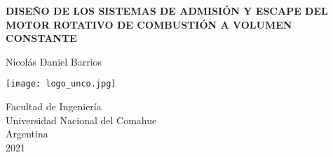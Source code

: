 \begin{titlepage}
    \begin{center}

        \vspace*{2cm}
        \huge
        \MakeUppercase{\textbf{Diseño de los sistemas de admisión y escape del
        Motor Rotativo de Combustión a Volumen Constante }}

        \vspace{0.8cm}
        Nicolás Daniel Barrios
        \vfill

        \vspace{0.8cm}
        \texttt{[image: logo\_unco.jpg]}
        \vspace{0.8cm}


        \large
        Facultad de Ingeniería \\
        Universidad Nacional del Comahue \\
        Argentina \\
        2021
    \end{center}
\end{titlepage}
